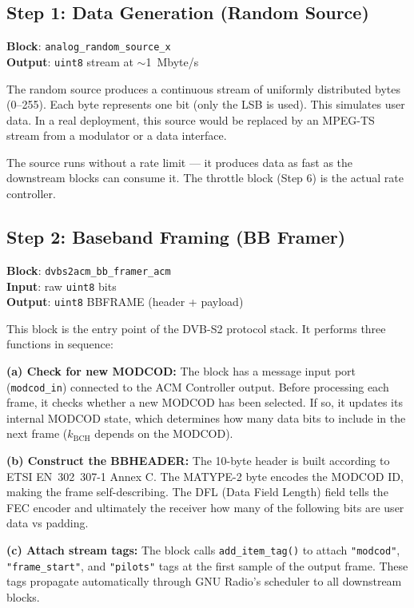 \documentclass[12pt,a4paper]{report}
\begin{document}
\subsection{Step 1: Data Generation (Random Source)}

\textbf{Block}: \texttt{analog\_random\_source\_x} \\
\textbf{Output}: \texttt{uint8} stream at $\sim$1~Mbyte/s

The random source produces a continuous stream of uniformly distributed bytes
(0--255). Each byte represents one bit (only the LSB is used). This simulates
user data. In a real deployment, this source would be replaced by an MPEG-TS
stream from a modulator or a data interface.

The source runs without a rate limit --- it produces data as fast as the
downstream blocks can consume it. The throttle block (Step 6) is the actual
rate controller.

\subsection{Step 2: Baseband Framing (BB Framer)}

\textbf{Block}: \texttt{dvbs2acm\_bb\_framer\_acm} \\
\textbf{Input}: raw \texttt{uint8} bits \\
\textbf{Output}: \texttt{uint8} BBFRAME (header + payload)

This block is the entry point of the DVB-S2 protocol stack. It performs three
functions in sequence:

\textbf{(a) Check for new MODCOD:} The block has a message input port
(\texttt{modcod\_in}) connected to the ACM Controller output. Before processing
each frame, it checks whether a new MODCOD has been selected. If so, it updates
its internal MODCOD state, which determines how many data bits to include in the
next frame ($k_\text{BCH}$ depends on the MODCOD).

\textbf{(b) Construct the BBHEADER:} The 10-byte header is built according to
ETSI EN~302~307-1 Annex C. The MATYPE-2 byte encodes the MODCOD ID, making the
frame self-describing. The DFL (Data Field Length) field tells the FEC encoder
and ultimately the receiver how many of the following bits are user data vs
padding.

\textbf{(c) Attach stream tags:} The block calls \texttt{add\_item\_tag()} to
attach \texttt{"modcod"}, \texttt{"frame\_start"}, and \texttt{"pilots"} tags
at the first sample of the output frame. These tags propagate automatically
through GNU Radio's scheduler to all downstream blocks.
\end{document}
